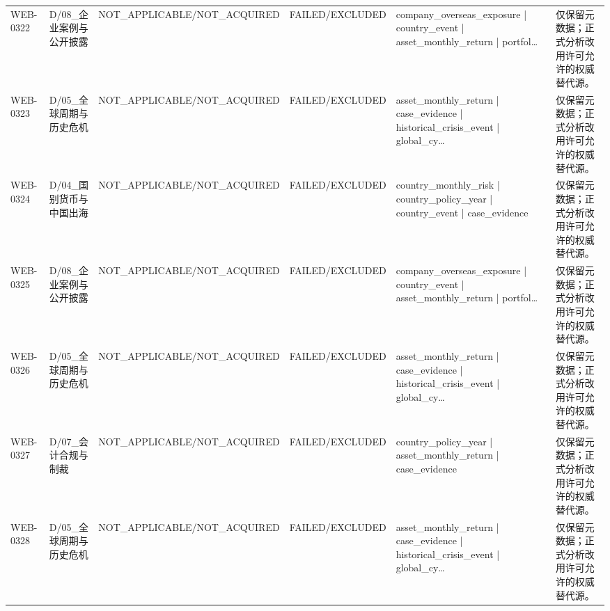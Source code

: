 \begin{landscape}
\begin{longtable}{p{1.8cm}p{2.6cm}p{2.6cm}p{2.6cm}p{4.8cm}p{7.2cm}}
WEB-0322 & D/\allowbreak{}08\_\allowbreak{}企业案例与公开披露 & NOT\_\allowbreak{}APPLICABLE/\allowbreak{}NOT\_\allowbreak{}ACQUIRED & FAILED/\allowbreak{}EXCLUDED & company\_\allowbreak{}overseas\_\allowbreak{}exposure | country\_\allowbreak{}event | asset\_\allowbreak{}monthly\_\allowbreak{}return | portfol… & 仅保留元数据；正式分析改用许可允许的权威替代源。\\
WEB-0323 & D/\allowbreak{}05\_\allowbreak{}全球周期与历史危机 & NOT\_\allowbreak{}APPLICABLE/\allowbreak{}NOT\_\allowbreak{}ACQUIRED & FAILED/\allowbreak{}EXCLUDED & asset\_\allowbreak{}monthly\_\allowbreak{}return | case\_\allowbreak{}evidence | historical\_\allowbreak{}crisis\_\allowbreak{}event | global\_\allowbreak{}cy… & 仅保留元数据；正式分析改用许可允许的权威替代源。\\
WEB-0324 & D/\allowbreak{}04\_\allowbreak{}国别货币与中国出海 & NOT\_\allowbreak{}APPLICABLE/\allowbreak{}NOT\_\allowbreak{}ACQUIRED & FAILED/\allowbreak{}EXCLUDED & country\_\allowbreak{}monthly\_\allowbreak{}risk | country\_\allowbreak{}policy\_\allowbreak{}year | country\_\allowbreak{}event | case\_\allowbreak{}evidence & 仅保留元数据；正式分析改用许可允许的权威替代源。\\
WEB-0325 & D/\allowbreak{}08\_\allowbreak{}企业案例与公开披露 & NOT\_\allowbreak{}APPLICABLE/\allowbreak{}NOT\_\allowbreak{}ACQUIRED & FAILED/\allowbreak{}EXCLUDED & company\_\allowbreak{}overseas\_\allowbreak{}exposure | country\_\allowbreak{}event | asset\_\allowbreak{}monthly\_\allowbreak{}return | portfol… & 仅保留元数据；正式分析改用许可允许的权威替代源。\\
WEB-0326 & D/\allowbreak{}05\_\allowbreak{}全球周期与历史危机 & NOT\_\allowbreak{}APPLICABLE/\allowbreak{}NOT\_\allowbreak{}ACQUIRED & FAILED/\allowbreak{}EXCLUDED & asset\_\allowbreak{}monthly\_\allowbreak{}return | case\_\allowbreak{}evidence | historical\_\allowbreak{}crisis\_\allowbreak{}event | global\_\allowbreak{}cy… & 仅保留元数据；正式分析改用许可允许的权威替代源。\\
WEB-0327 & D/\allowbreak{}07\_\allowbreak{}会计合规与制裁 & NOT\_\allowbreak{}APPLICABLE/\allowbreak{}NOT\_\allowbreak{}ACQUIRED & FAILED/\allowbreak{}EXCLUDED & country\_\allowbreak{}policy\_\allowbreak{}year | asset\_\allowbreak{}monthly\_\allowbreak{}return | case\_\allowbreak{}evidence & 仅保留元数据；正式分析改用许可允许的权威替代源。\\
WEB-0328 & D/\allowbreak{}05\_\allowbreak{}全球周期与历史危机 & NOT\_\allowbreak{}APPLICABLE/\allowbreak{}NOT\_\allowbreak{}ACQUIRED & FAILED/\allowbreak{}EXCLUDED & asset\_\allowbreak{}monthly\_\allowbreak{}return | case\_\allowbreak{}evidence | historical\_\allowbreak{}crisis\_\allowbreak{}event | global\_\allowbreak{}cy… & 仅保留元数据；正式分析改用许可允许的权威替代源。\\

\end{longtable}
\end{landscape}
